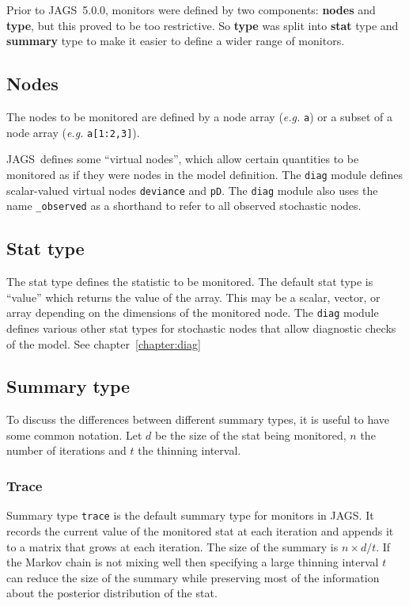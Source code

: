 \documentclass[11pt, a4paper, titlepage]{report}
\newcommand{\JAGS}{\textsf{JAGS}}
\begin{document}
Prior to \JAGS\ 5.0.0, monitors were defined by two components: {\bf
  nodes} and {\bf type}, but this proved to be too restrictive.  So
{\bf type} was split into {\bf stat} type and {\bf summary} type to
make it easier to define a wider range of monitors.

\subsection{Nodes}

The nodes to be monitored are defined by a node array ({\em e.g.}
\texttt{a}) or a subset of a node array ({\em e.g.}
\texttt{a[1:2,3]}).

\JAGS\ defines some ``virtual nodes'', which allow certain quantities
to be monitored as if they were nodes in the model definition. The
\texttt{diag} module defines scalar-valued virtual nodes
\texttt{deviance} and \texttt{pD}. The \texttt{diag} module also uses
the name \texttt{\_observed} as a shorthand to refer to all observed
stochastic nodes.

\subsection{Stat type}

The stat type defines the statistic to be monitored.  The default stat
type is ``value'' which returns the value of the array. This may be a
scalar, vector, or array depending on the dimensions of the monitored
node. The \texttt{diag} module defines various other stat types for
stochastic nodes that allow diagnostic checks of the model. See
chapter~\ref{chapter:diag}

\subsection{Summary type}

To discuss the differences between different summary types, it is
useful to have some common notation. Let $d$ be the size of the stat
being monitored, $n$ the number of iterations and $t$ the thinning
interval.

\subsubsection{Trace}

Summary type \texttt{trace} is the default summary type for monitors
in \JAGS. It records the current value of the monitored stat at each
iteration and appends it to a matrix that grows at each iteration. The
size of the summary is $n \times d/t$. If the Markov chain is not
mixing well then specifying a large thinning interval $t$ can reduce
the size of the summary while preserving most of the information about
the posterior distribution of the stat.
\end{document}

